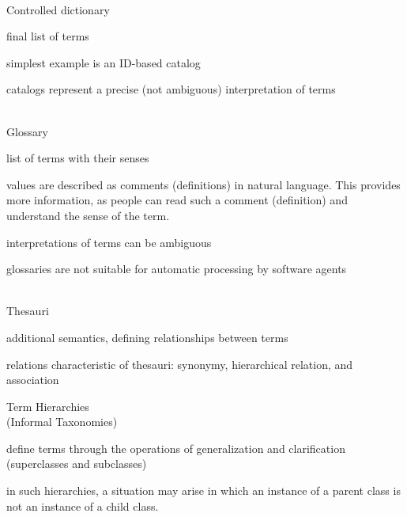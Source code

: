 \begin{frame}{\\Controlled dictionary}
	\topline
	\justifying
	
	\vspace{10mm}
	\begin{textitemize}
		\item final list of terms
		\item simplest example is an ID-based catalog
		\item catalogs represent a precise (not ambiguous) interpretation of terms
	\end{textitemize}
	
\end{frame}

\begin{frame}{\\Glossary}
	\topline
	\justifying
	
	\vspace{10mm}
	\begin{textitemize}
		\item list of terms with their senses
		\item values are described as comments (definitions) in natural language. This provides more information, as people can read such a comment (definition) and understand the sense of the term.
		\item interpretations of terms can be ambiguous
		\item glossaries are not suitable for automatic processing by software agents
	\end{textitemize}
	
\end{frame}

\begin{frame}{\\Thesauri}
	\topline
	\justifying
	
	\vspace{10mm}
	\begin{textitemize}
		\item additional semantics, defining relationships between terms
		\item relations characteristic of thesauri: synonymy, hierarchical relation, and association
	\end{textitemize}
	
\end{frame}

\begin{frame}{Term Hierarchies\\ (Informal Taxonomies)}
	\topline
	\justifying
	
	\vspace{10mm}
	\begin{textitemize}
		\item define terms through the operations of generalization and clarification (superclasses and subclasses)
		\item in such hierarchies, a situation may arise in which an instance of a parent class is not an instance of a child class.
	\end{textitemize}
	
\end{frame}

